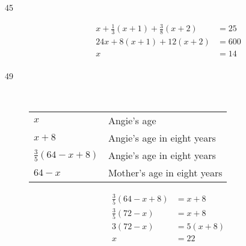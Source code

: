 \documentclass[letterpaper]{exam}
\begin{document}
\begin{description}

      \item[45]
        \begin{align*}
          x + \frac{1}{3} (x + 1) + \frac{3}{8} (x + 2)            & = 25 \\
          24x + 8(x + 1) + 12(x + 2)                               & = 600 \\
          x                                                        & = \boxed{ 14 } \\
        \end{align*}

      \item[49] \ 

        \begin{tabular}{ll}
          \toprule
          $x$                        & Angie's age \\
          $x + 8$                    & Angie's age in eight years \\
          $\frac{3}{5} (64 - x + 8)$ & Angie's age in eight years \\
          $64 - x$                   & Mother's age in eight years \\
          \bottomrule
        \end{tabular}

      \begin{align*}
        \frac{3}{5}(64 - x + 8)       & = x + 8 \\
        \frac{3}{5} (72 - x)          & = x + 8 \\
        3(72 - x)                     & = 5(x + 8) \\
        x                             & = 22 \\
      \end{align*}


\end{description}
\end{document}
